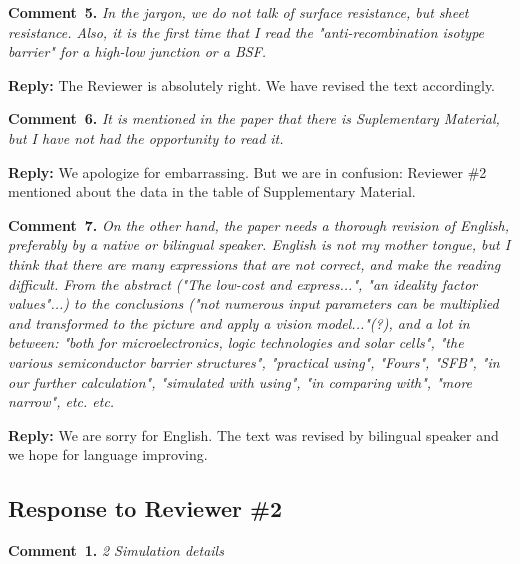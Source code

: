 \documentclass[num-refs]{wiley-article} %
\begin{document}
\vspace{1cm}
\noindent
\textcolor[rgb]{0.00,0.50,1.00}{\textbf{Comment~5.}}
\emph{In the jargon, we do not talk of surface resistance, but sheet resistance.
Also, it is the first time that I read the "anti-recombination isotype barrier" for a high-low junction or a BSF.}

\vspace{0.5cm}
\noindent
\textcolor[rgb]{0.51,0.00,0.00}{\textbf{Reply:}}
The Reviewer is absolutely right.
We have revised the text accordingly. 

\vspace{1cm}
\noindent
\textcolor[rgb]{0.00,0.50,1.00}{\textbf{Comment~6.}}
\emph{It is mentioned in the paper that there is Suplementary Material, but I have not had the opportunity to read it.}

\vspace{0.5cm}
\noindent
\textcolor[rgb]{0.51,0.00,0.00}{\textbf{Reply:}}
We apologize for embarrassing.
But we are in confusion:
Reviewer \#2 mentioned about the data in the table of Supplementary Material.


\vspace{1cm}
\noindent
\textcolor[rgb]{0.00,0.50,1.00}{\textbf{Comment~7.}}
\emph{On the other hand, the paper needs a thorough revision of English, preferably by a native or bilingual speaker.
English is not my mother tongue, but I think that there are many expressions that are not correct, and make the reading difficult.
From the abstract ("The low-cost and express...", "an ideality factor values"...)
to the conclusions ("not numerous input parameters can be multiplied and transformed to the picture and apply a vision model..."(?),
and a lot in between: "both for microelectronics, logic technologies and solar cells",
"the various semiconductor barrier structures", "practical using", "Fours", "SFB", "in our further calculation",
"simulated with using", "in comparing with", "more narrow", etc. etc. }

\vspace{0.5cm}
\noindent
\textcolor[rgb]{0.51,0.00,0.00}{\textbf{Reply:}}
We are sorry for English.
The text was revised by bilingual speaker and we hope for language improving.




\subsection*{Response to Reviewer \#2 }


\textcolor[rgb]{0.00,0.50,1.00}{\textbf{Comment~1.}}
\emph{2 Simulation details}
\end{document}
